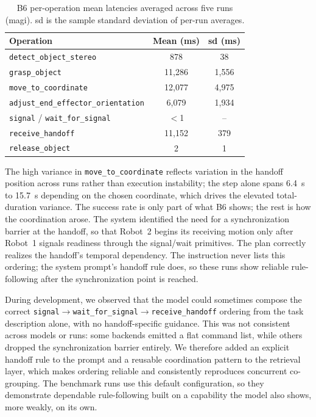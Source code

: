 \documentclass[
     12pt,
     a4paper,
     BCOR=10mm,
     DIV=14,
     listof=totoc,
     bibliography=totoc,
     parskip,
     twoside,
     headsepline
     ]{scrreprt}
\begin{document}
\begin{table}[ht]
	\centering
	\begin{tabular}{lcc}
		\hline
		\textbf{Operation}                           & \textbf{Mean (ms)} & \textbf{\gls{sd} (ms)} \\
		\hline
		\texttt{detect\_object\_stereo}              & 878                & 38                     \\
		\texttt{grasp\_object}                       & 11{,}286           & 1{,}556                \\
		\texttt{move\_to\_coordinate}                & 12{,}077           & 4{,}975                \\
		\texttt{adjust\_end\_effector\_orientation}  & 6{,}079            & 1{,}934                \\
		\texttt{signal} / \texttt{wait\_for\_signal} & $<$1               & --                     \\
		\texttt{receive\_handoff}                    & 11{,}152           & 379                    \\
		\texttt{release\_object}                     & 2                  & 1                      \\
		\hline
	\end{tabular}
	\caption{B6 per-operation mean latencies averaged across five runs (\gls{magi}). \gls{sd} is the sample standard deviation of per-run averages.}
	\label{tab:b6-latency}
\end{table}

The high variance in \texttt{move\_to\_coordinate} reflects variation in the handoff position across runs rather than execution instability; the step alone spans 6.4~s to 15.7~s depending on the chosen coordinate, which drives the elevated total-duration variance. The success rate is only part of what B6 shows; the rest is how the coordination arose. The system identified the need for a synchronization barrier at the handoff, so that Robot~2 begins its receiving motion only after Robot~1 signals readiness through the signal/wait primitives. The plan correctly realizes the handoff's temporal dependency. The instruction never lists this ordering; the system prompt's handoff rule does, so these runs show reliable rule-following after the synchronization point is reached.

During development, we observed that the model could sometimes compose the correct \texttt{signal}$\rightarrow$\texttt{wait\_for\_signal}$\rightarrow$\texttt{receive\_handoff} ordering from the task description alone, with no handoff-specific guidance. This was not consistent across models or runs: some backends emitted a flat command list, while others dropped the synchronization barrier entirely. We therefore added an explicit handoff rule to the prompt and a reusable coordination pattern to the retrieval layer, which makes ordering reliable and consistently reproduces concurrent co-grouping. The benchmark runs use this default configuration, so they demonstrate dependable rule-following built on a capability the model also shows, more weakly, on its own.
\end{document}
